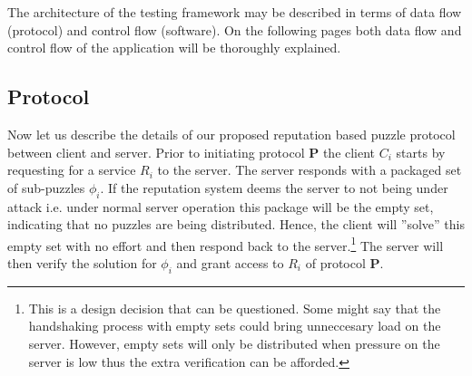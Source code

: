 The architecture of the testing framework may be described in terms of data flow (protocol) and control flow (software). On the following pages both data flow and control flow of the application will be thoroughly explained.

\subsection{Protocol}
Now let us describe the details of our proposed reputation based puzzle protocol between client and server. Prior to initiating protocol \textbf{P} the client $C_i$ starts by requesting for a service $R_i$ to the server. The server responds with a packaged set of sub-puzzles $\phi_i$. If the reputation system deems the server to not being under attack i.e. under normal server operation this package will be the empty set, indicating that no puzzles are being distributed. Hence, the client will ''solve'' this empty set with no effort and then respond back to the server.\footnote{This is a design decision that can be questioned. Some might say that the handshaking process with empty sets could bring unneccesary load on the server. However, empty sets will only be distributed when pressure on the server is low thus the extra verification can be afforded.} The server will then verify the solution for $\phi_i$ and grant access to $R_i$ of protocol \textbf{P}.


